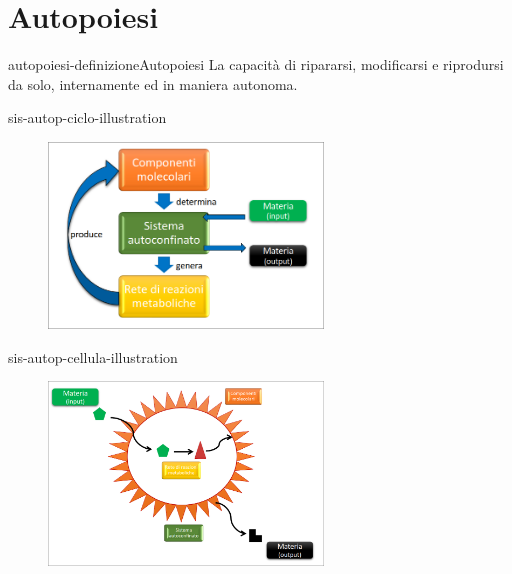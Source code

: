 \documentclass[preview]{standalone}
\begin{document}


\section{Autopoiesi}

\begin{snippetdefinition}{autopoiesi-definizione}{Autopoiesi}
    La capacità di ripararsi, modificarsi e riprodursi da solo, internamente ed in maniera autonoma.
\end{snippetdefinition}



\begin{snippet}{sis-autop-ciclo-illustration}
    \begin{center}
    \begin{figure}[ht]
        \centering
        \includegraphics[width=0.65\textwidth]{./resources/sis_autop_ciclo.png}
    \end{figure}
    \end{center}
\end{snippet}


\begin{snippet}{sis-autop-cellula-illustration}
    \begin{center}
    \begin{figure}[ht]
        \centering
        \includegraphics[width=0.65\textwidth]{./resources/sis_autop_cellula.png}
    \end{figure}
    \end{center}
\end{snippet}
\end{document}
